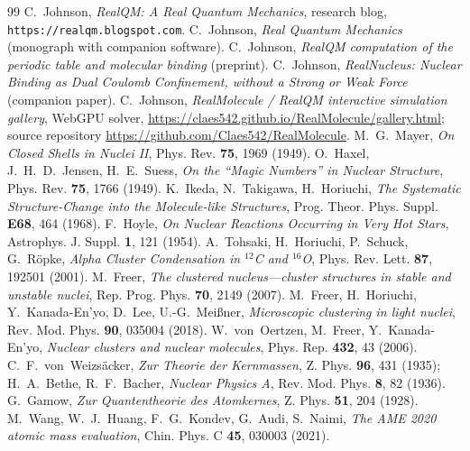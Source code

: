 \documentclass[11pt]{article}
\begin{document}
\begin{thebibliography}{99}
 C.~Johnson, \emph{RealQM: A Real Quantum Mechanics}, research blog,
\texttt{https://realqm.blogspot.com}.
 C.~Johnson, \emph{Real Quantum Mechanics} (monograph with companion software).
 C.~Johnson, \emph{RealQM computation of the periodic table and molecular
binding} (preprint).
 C.~Johnson, \emph{RealNucleus: Nuclear Binding as Dual Coulomb
Confinement, without a Strong or Weak Force} (companion paper).
 C.~Johnson, \emph{RealMolecule / RealQM interactive simulation gallery}, WebGPU
solver, \url{https://claes542.github.io/RealMolecule/gallery.html}; source repository
\url{https://github.com/Claes542/RealMolecule}.
 M.~G.~Mayer, \emph{On Closed Shells in Nuclei II}, Phys. Rev. \textbf{75}, 1969
(1949).
 O.~Haxel, J.~H.~D.~Jensen, H.~E.~Suess, \emph{On the ``Magic Numbers'' in
Nuclear Structure}, Phys. Rev. \textbf{75}, 1766 (1949).
 K.~Ikeda, N.~Takigawa, H.~Horiuchi, \emph{The Systematic Structure-Change into the
Molecule-like Structures}, Prog. Theor. Phys. Suppl. \textbf{E68}, 464 (1968).
 F.~Hoyle, \emph{On Nuclear Reactions Occurring in Very Hot Stars}, Astrophys. J.
Suppl. \textbf{1}, 121 (1954).
 A.~Tohsaki, H.~Horiuchi, P.~Schuck, G.~R\"opke, \emph{Alpha Cluster Condensation in
$^{12}$C and $^{16}$O}, Phys. Rev. Lett. \textbf{87}, 192501 (2001).
 M.~Freer, \emph{The clustered nucleus---cluster structures in stable and unstable
nuclei}, Rep. Prog. Phys. \textbf{70}, 2149 (2007).
 M.~Freer, H.~Horiuchi, Y.~Kanada-En'yo, D.~Lee, U.-G.~Mei{\ss}ner, \emph{Microscopic
clustering in light nuclei}, Rev. Mod. Phys. \textbf{90}, 035004 (2018).
 W.~von~Oertzen, M.~Freer, Y.~Kanada-En'yo, \emph{Nuclear clusters and nuclear
molecules}, Phys. Rep. \textbf{432}, 43 (2006).
 C.~F.~von~Weizs\"acker, \emph{Zur Theorie der Kernmassen}, Z. Phys.
\textbf{96}, 431 (1935); H.~A.~Bethe, R.~F.~Bacher, \emph{Nuclear Physics A}, Rev. Mod. Phys.
\textbf{8}, 82 (1936).
 G.~Gamow, \emph{Zur Quantentheorie des Atomkernes}, Z. Phys. \textbf{51}, 204 (1928).
 M.~Wang, W.~J.~Huang, F.~G.~Kondev, G.~Audi, S.~Naimi, \emph{The AME 2020 atomic mass
evaluation}, Chin. Phys. C \textbf{45}, 030003 (2021).
\end{thebibliography}
\end{document}
